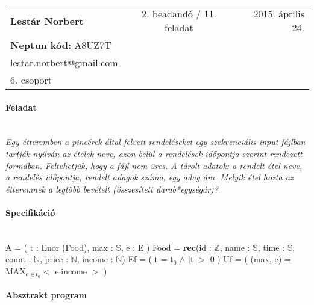 \documentclass[12pt]{report}
\newcommand{\forceindent}{\leavevmode{\parindent=2.8em\indent}}
\begin{document}
\begin{tabular}{lcr}
\textbf{Lestár Norbert} & 2. beadandó / 11. feladat  & 2015. április 24. \\
\textbf{Neptun kód:} A8UZ7T \\
lestar.norbert@gmail.com \\
6. csoport \\
\end{tabular}
\paragraph{Feladat} \hspace{0pt} \\
\textit{ Egy étteremben a pincérek által felvett rendeléseket egy szekvenciális input fájlban tartják nyilván az  ételek  neve,  azon  belül  a rendelések időpontja szerint  rendezett  formában. Feltehetjük, hogy a fájl nem üres. A tárolt adatok: a rendelt étel neve, a 
rendelés időpontja, rendelt  adagok száma, egy adag ára. Melyik étel hozta az étteremnek a legtöbb bevételt (összesített darab*egységár)? }
\paragraph{Specifikáció} \hspace{0pt} \\
A = ( t : Enor (Food), max : $\mathbb{S}$, e : E ) \newline
\forceindent Food = \textbf{rec}(id : $\mathbb{Z}$, name : $\mathbb{S}$, time : $\mathbb{S}$, count : $\mathbb{N}$, price : $\mathbb{N}$, income : $\mathbb{N}$) \newline
Ef = ( t = t$_{0}$ $\wedge$ $|$t$| >$ 0 ) \newline
Uf = ( (max, e) = MAX$_{e \in t_{0}} <$ e.income $>$ ) \newline
\paragraph{Absztrakt program} \hspace{2pt} \\ 

\begin{stukibox}[14cm]
\end{stukibox}%
\hfill \newline
\begin{stukibox}[14cm]
\begin{WHILE}{4}{}
\begin{IF}{1}
{ }
\ELSE
{}
\end{IF}
\end{WHILE}
\end{stukibox}%
\end{document}
